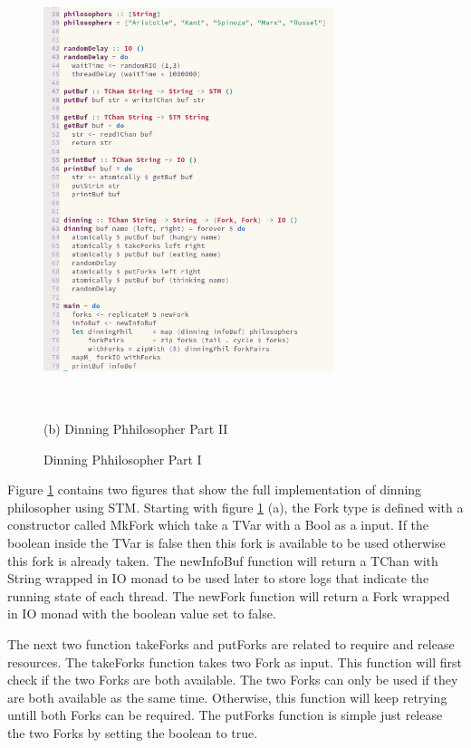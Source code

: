 \documentclass{article}
\begin{document}
\begin{normalsize}
\begin{figure}[H]
\begin{minipage}[b]{0.48\linewidth}
      \centerline{\includegraphics[width=8.5cm, height=12.5cm]{dinning2}}
      \centerline{ (b) Dinning Phhilosopher Part II }\medskip
    \end{minipage}
    \caption{Dinning Phhilosopher Part I}
    \label{fig:dinning}
  \end{figure}

  Figure \ref{fig:dinning} contains two figures that show the full
  implementation of dinning philosopher using STM. Starting with figure
  \ref{fig:dinning} (a), the Fork type is defined with a constructor called
  MkFork which take a TVar with a Bool as a input. If the boolean inside the
  TVar is false then this fork is available to be used otherwise this fork is
  already taken. The newInfoBuf function will return a TChan with String wrapped
  in IO monad to be used later to store logs that indicate the running state of
  each thread. The newFork function will return a Fork wrapped in IO monad with
  the boolean value set to false.

  The next two function takeForks and putForks are related to require and
  release resources. The takeForks function takes two Fork as input. This
  function will first check if the two Forks are both available. The two Forks
  can only be used if they are both available as the same time. Otherwise, this
  function will keep retrying untill both Forks can be required. The putForks
  function is simple just release the two Forks by setting the boolean to true.


\end{normalsize}
\end{document}
